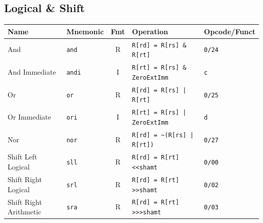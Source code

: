 \documentclass[10pt]{article}
\newcommand{\op}[1]{\texttt{#1}}
\begin{document}
\subsection{Logical \& Shift}
\begin{center}
\small
\begin{tabular}{@{}p{2.7cm}p{1.6cm}cp{5.4cm}l@{}}
\toprule
Name & Mnemonic & Fmt & Operation & Opcode/Funct \\
\midrule
And              & \op{and}  & R & \op{R[rd] = R[rs] \& R[rt]} & \op{0/24} \\
And Immediate    & \op{andi} & I & \op{R[rt] = R[rs] \& ZeroExtImm} & \op{c} \\
Or               & \op{or}   & R & \op{R[rd] = R[rs] | R[rt]} & \op{0/25} \\
Or Immediate     & \op{ori}  & I & \op{R[rt] = R[rs] | ZeroExtImm} & \op{d} \\
Nor              & \op{nor}  & R & \op{R[rd] = \textasciitilde(R[rs] | R[rt])} & \op{0/27} \\
Shift Left Logical  & \op{sll} & R & \op{R[rd] = R[rt] \textless\textless shamt} & \op{0/00} \\
Shift Right Logical & \op{srl} & R & \op{R[rd] = R[rt] \textgreater\textgreater shamt} & \op{0/02} \\
Shift Right Arithmetic & \op{sra} & R & \op{R[rd] = R[rt] \textgreater\textgreater\textgreater shamt} & \op{0/03} \\
\bottomrule
\end{tabular}
\end{center}
\end{document}
